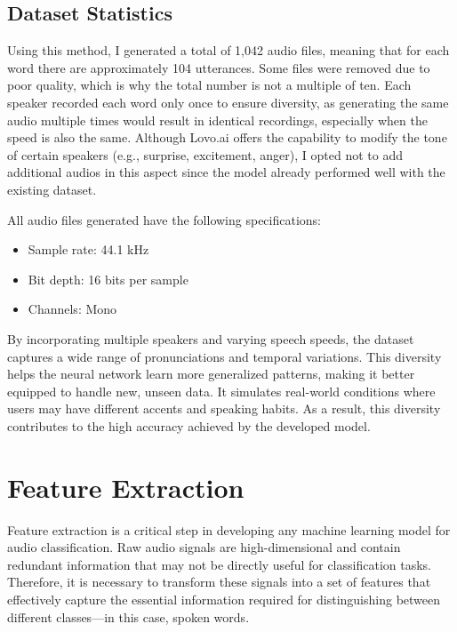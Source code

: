 \documentclass[12pt]{article}
\begin{document}
\subsection{Dataset Statistics}

Using this method, I generated a total of 1,042 audio files, meaning that for each word there are approximately 104 utterances. Some files were removed due to poor quality, which is why the total number is not a multiple of ten. Each speaker recorded each word only once to ensure diversity, as generating the same audio multiple times would result in identical recordings, especially when the speed is also the same. Although Lovo.ai offers the capability to modify the tone of certain speakers (e.g., surprise, excitement, anger), I opted not to add additional audios in this aspect since the model already performed well with the existing dataset.

All audio files generated have the following specifications:

\begin{itemize}
    \item Sample rate: 44.1 kHz
    \item Bit depth: 16 bits per sample
    \item Channels: Mono
\end{itemize}

By incorporating multiple speakers and varying speech speeds, the dataset captures a wide range of pronunciations and temporal variations. This diversity helps the neural network learn more generalized patterns, making it better equipped to handle new, unseen data. It simulates real-world conditions where users may have different accents and speaking habits. As a result, this diversity contributes to the high accuracy achieved by the developed model.


\newpage




\section{Feature Extraction}

Feature extraction is a critical step in developing any machine learning model for audio classification. Raw audio signals are high-dimensional and contain redundant information that may not be directly useful for classification tasks. Therefore, it is necessary to transform these signals into a set of features that effectively capture the essential information required for distinguishing between different classes—in this case, spoken words.
\end{document}
